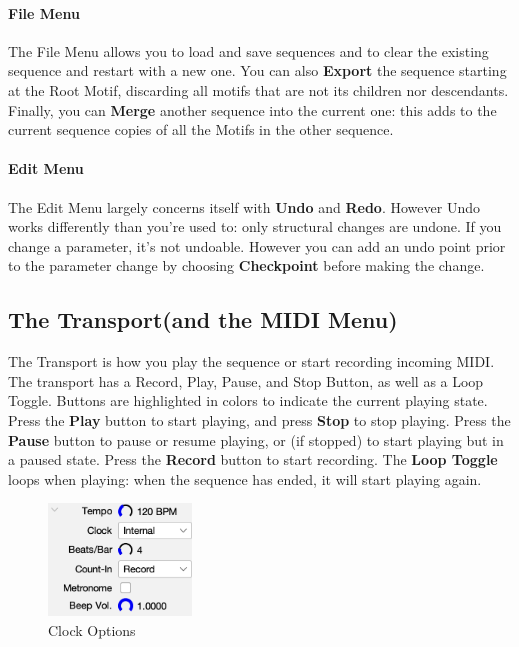 \documentclass[twoside,10pt]{article}
\begin{document}
\paragraph{File Menu}
The File Menu allows you to load and save sequences and to clear the existing sequence and restart with a new one.  You can also {\bf Export} the sequence starting at the Root Motif, discarding all motifs that are not its children nor descendants.  Finally, you can {\bf Merge} another sequence into the current one: this adds to the current sequence copies of all the Motifs in the other sequence.

\paragraph{Edit Menu}
The Edit Menu largely concerns itself with {\bf Undo} and {\bf Redo}.  However Undo works differently than you're used to: only structural changes are undone.  If you change a parameter, it's not undoable.  However you can add an undo point prior to the parameter change by choosing {\bf Checkpoint} before making the change.


\subsection{The Transport\quad (and the MIDI Menu)}

The Transport is how you play the sequence or start recording incoming MIDI.  The transport has a Record, Play, Pause, and Stop Button, as well as a Loop Toggle.  Buttons are highlighted in colors to indicate the current playing state.  Press the {\bf Play} button to start playing, and press {\bf Stop} to stop playing.  Press the {\bf Pause} button to pause or resume playing, or (if stopped) to start playing but in a paused state.  Press the {\bf Record} button to start recording.  The {\bf Loop Toggle} loops when playing: when the sequence has ended, it will start playing again.

\begin{figure}
\includegraphics[width=1.5in]{clock}
\vspace{-2em}
\caption{Clock Options}
\label{clockoptions}
\end{figure}
\end{document}
